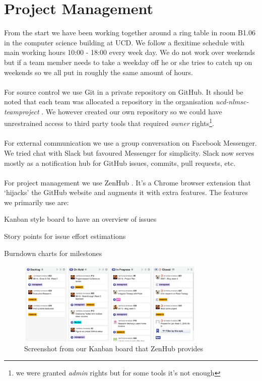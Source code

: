 \documentclass{article}
\begin{document}
\section{Project Management}
From the start we have been working together around a ring table in room B1.06 in the computer science building at UCD. We follow a flexitime schedule with main working hours 10:00 - 18:00 every week day. We do not work over weekends but if a team member needs to take a weekday off he or she tries to catch up on weekends so we all put in roughly the same amount of hours.
\\\\
For source control we use Git in a private repository on GitHub. It should be noted that each team was allocated a repository in the organisation \linebreak \mbox{\textit{ucd-nlmsc-teamproject}} \cite{ucdgithub}. We however created our own repository \cite{gitrepo} so we could have unrestrained access to third party tools that required \textit{owner} rights\footnote{we were granted \textit{admin} rights but for some tools it's not enough}.
\\\\
For external communication we use a group conversation on Facebook Messenger. We tried chat with Slack  but favoured Messenger for simplicity. Slack now serves mostly as a notification hub for GitHub issues, commits, pull requests, etc.
\\\\
For project management we use ZenHub \cite{zenhub}. It's a Chrome browser extension that `hijacks' the GitHub website and augments it with extra features. The features we primarily use are:

\begin{samepage}
\begin{itemize*}
	\item Kanban style board to have an overview of issues
	\item Story points for issue effort estimations
	\item Burndown charts for milestones
\end{itemize*}
\end{samepage}


\begin{figure}[H]
    \centering
    \includegraphics[width=0.8\textwidth]{kanbanboard}  
    \caption{Screenshot from our Kanban board that ZenHub provides}
\end{figure}
\end{document}
